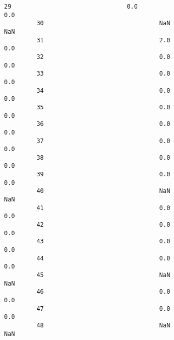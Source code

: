 \documentclass[11pt]{article}
\begin{document}
\begin{Verbatim}[commandchars=\\\{\}]
         29                                0.0                                    0.0   
         30                                NaN                                    NaN   
         31                                2.0                                    0.0   
         32                                0.0                                    0.0   
         33                                0.0                                    0.0   
         34                                0.0                                    0.0   
         35                                0.0                                    0.0   
         36                                0.0                                    0.0   
         37                                0.0                                    0.0   
         38                                0.0                                    0.0   
         39                                0.0                                    0.0   
         40                                NaN                                    NaN   
         41                                0.0                                    0.0   
         42                                0.0                                    0.0   
         43                                0.0                                    0.0   
         44                                0.0                                    0.0   
         45                                NaN                                    NaN   
         46                                0.0                                    0.0   
         47                                0.0                                    0.0   
         48                                NaN                                    NaN   
         

\end{Verbatim}
\end{document}
